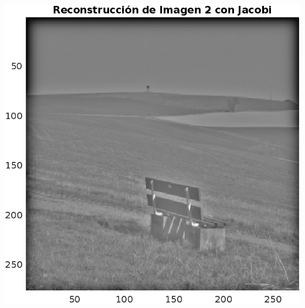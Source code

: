\begin{homeworkProblem}
\begin{solucion}
\begin{center}
      \includegraphics[scale=0.6]{Figures/Figure_2J.png}
    \end{center}
  \end{solucion}
\end{homeworkProblem}
